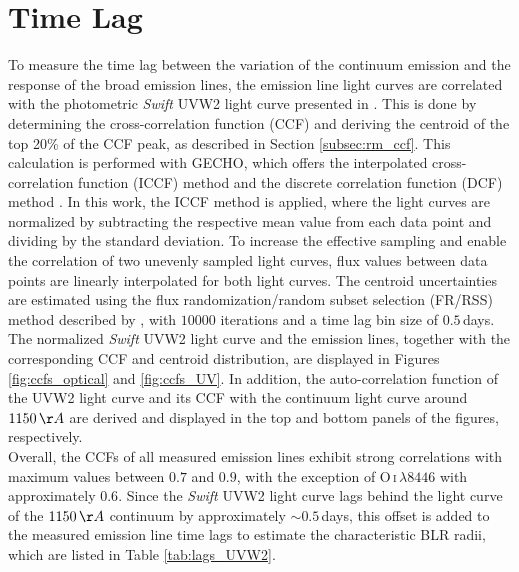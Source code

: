 \section{Time Lag}
\label{sec:time_lag_bh_mass}
To measure the time lag between the variation of the continuum emission and the response of the broad emission lines, the emission line light curves are correlated with the photometric \textit{Swift} UVW2 light curve presented in \cite{mchardy2018x}. This is done by determining the cross-correlation function (CCF) and deriving the centroid of the top 20\% of the CCF peak, as described in Section \ref{subsec:rm_ccf}. This calculation is performed with GECHO, which offers the interpolated cross-correlation function (ICCF) method \parencite{gaskell_peterson1986} and the discrete correlation function (DCF) method \parencite{edelson1988discrete}. In this work, the ICCF method is applied, where the light curves are normalized by subtracting the respective mean value from each data point and dividing by the standard deviation. To increase the effective sampling and enable the correlation of two unevenly sampled light curves, flux values between data points are linearly interpolated for both light curves. The centroid uncertainties are estimated using the flux randomization/random subset selection (FR/RSS) method described by \cite{Peterson_1998b}, with $10000$ iterations and a time lag bin size of $0.5$\,days. The normalized \textit{Swift} UVW2 light curve and the emission lines, together with the corresponding CCF and centroid distribution, are displayed in Figures \ref{fig:ccfs_optical} and \ref{fig:ccfs_UV}. In addition, the auto-correlation function of the UVW2 light curve and its CCF with the continuum light curve around $1150\,\AA$ are derived and displayed in the top and bottom panels of the figures, respectively. \\
Overall, the CCFs of all measured emission lines exhibit strong correlations with maximum values between $0.7$ and $0.9$, with the exception of O\,\textsc{i}$\,\lambda 8446$ with approximately $0.6$. Since the \textit{Swift} UVW2 light curve lags behind the light curve of the $1150\,\AA$ continuum by approximately $\sim 0.5$\,days, this offset is added to the measured emission line time lags to estimate the characteristic BLR radii, which are listed in Table \ref{tab:lags_UVW2}.
